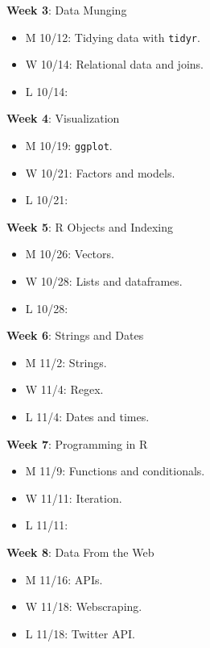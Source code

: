 \documentclass[
]{book}
\providecommand{\tightlist}{%
  \setlength{\itemsep}{0pt}\setlength{\parskip}{0pt}}
\begin{document}
\textbf{Week 3}: Data Munging

\begin{itemize}
\tightlist
\item
  M 10/12: Tidying data with \texttt{tidyr}.
\item
  W 10/14: Relational data and joins.
\item
  L 10/14:
\end{itemize}

\textbf{Week 4}: Visualization

\begin{itemize}
\tightlist
\item
  M 10/19: \texttt{ggplot}.
\item
  W 10/21: Factors and models.
\item
  L 10/21:
\end{itemize}

\textbf{Week 5}: R Objects and Indexing

\begin{itemize}
\tightlist
\item
  M 10/26: Vectors.
\item
  W 10/28: Lists and dataframes.
\item
  L 10/28:
\end{itemize}

\textbf{Week 6}: Strings and Dates

\begin{itemize}
\tightlist
\item
  M 11/2: Strings.
\item
  W 11/4: Regex.
\item
  L 11/4: Dates and times.
\end{itemize}

\textbf{Week 7}: Programming in R

\begin{itemize}
\tightlist
\item
  M 11/9: Functions and conditionals.
\item
  W 11/11: Iteration.
\item
  L 11/11:
\end{itemize}

\textbf{Week 8}: Data From the Web

\begin{itemize}
\tightlist
\item
  M 11/16: APIs.
\item
  W 11/18: Webscraping.
\item
  L 11/18: Twitter API.
\end{itemize}
\end{document}
